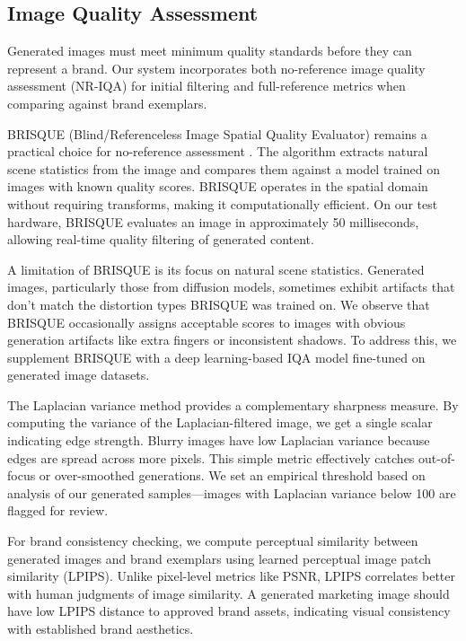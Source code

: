 \documentclass[11pt, twocolumn]{article}
\begin{document}
\subsection{Image Quality Assessment}

Generated images must meet minimum quality standards before they can represent a brand. Our system incorporates both no-reference image quality assessment (NR-IQA) for initial filtering and full-reference metrics when comparing against brand exemplars.

BRISQUE (Blind/Referenceless Image Spatial Quality Evaluator) remains a practical choice for no-reference assessment \cite{Mittal2012}. The algorithm extracts natural scene statistics from the image and compares them against a model trained on images with known quality scores. BRISQUE operates in the spatial domain without requiring transforms, making it computationally efficient. On our test hardware, BRISQUE evaluates an image in approximately 50 milliseconds, allowing real-time quality filtering of generated content.

A limitation of BRISQUE is its focus on natural scene statistics. Generated images, particularly those from diffusion models, sometimes exhibit artifacts that don't match the distortion types BRISQUE was trained on. We observe that BRISQUE occasionally assigns acceptable scores to images with obvious generation artifacts like extra fingers or inconsistent shadows. To address this, we supplement BRISQUE with a deep learning-based IQA model fine-tuned on generated image datasets.

The Laplacian variance method provides a complementary sharpness measure. By computing the variance of the Laplacian-filtered image, we get a single scalar indicating edge strength. Blurry images have low Laplacian variance because edges are spread across more pixels. This simple metric effectively catches out-of-focus or over-smoothed generations. We set an empirical threshold based on analysis of our generated samples---images with Laplacian variance below 100 are flagged for review.

For brand consistency checking, we compute perceptual similarity between generated images and brand exemplars using learned perceptual image patch similarity (LPIPS). Unlike pixel-level metrics like PSNR, LPIPS correlates better with human judgments of image similarity. A generated marketing image should have low LPIPS distance to approved brand assets, indicating visual consistency with established brand aesthetics.
\end{document}
